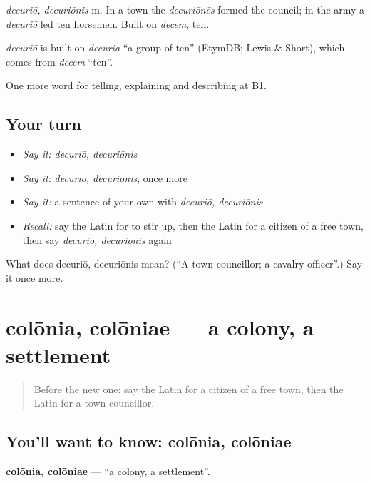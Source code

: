 \emph{decuriō, decuriōnis} m. In a town the \emph{decuriōnēs} formed the council; in the army a \emph{decuriō} led ten horsemen. Built on \emph{decem}, ten.

\begin{cousinweb}
\emph{decuriō} is built on \emph{decuria} \textquotedblleft{}a group of ten\textquotedblright{} (EtymDB; Lewis \& Short), which comes from \emph{decem} \textquotedblleft{}ten\textquotedblright{}.
\end{cousinweb}

\begin{grammarlens}[title={What you've built}]
One more word for telling, explaining and describing at B1.
\end{grammarlens}

\subsection*{Your turn}
\begin{itemize}
\raggedright
  \item \emph{Say it:} \emph{decuriō, decuriōnis}
  \item \emph{Say it:} \emph{decuriō, decuriōnis}, once more
  \item \emph{Say it:} a sentence of your own with \emph{decuriō, decuriōnis}
  \item \emph{Recall:} say the Latin for to stir up, then the Latin for a citizen of a free town, then say \emph{decuriō, decuriōnis} again
\end{itemize}

\begin{tcolorbox}[breakable,colback=teal!4,colframe=teal!35!black,title={Before you move on}]
What does decuriō, decuriōnis mean? (\textquotedblleft{}A town councillor; a cavalry officer\textquotedblright{}.) Say it once more.
\end{tcolorbox}
\section[colōnia, colōniae]{colōnia, colōniae — a colony, a settlement}

\label{lesson:LA-C388-colonia}



\begin{quote}
Before the new one: say the Latin for a citizen of a free town, then the Latin for a town councillor.
\end{quote}

\subsection*{You'll want to know: colōnia, colōniae}
\textbf{colōnia, colōniae} — \textquotedblleft{}a colony, a settlement\textquotedblright{}.

